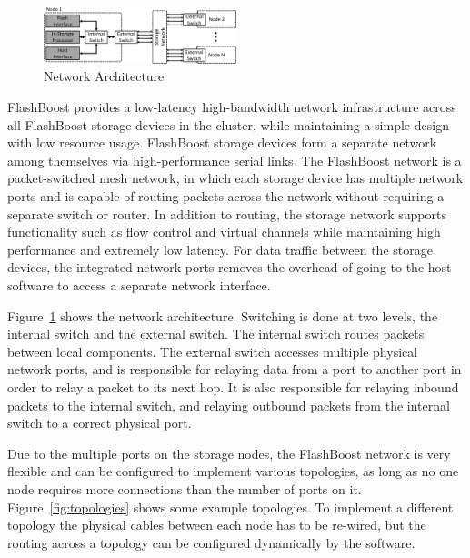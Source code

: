 \begin{figure}[t]
	\begin{center}
	\includegraphics[width=0.5\textwidth]{figures/network-architecture-crop.pdf}
	\caption{Network Architecture}
	\label{fig:networkinterface}
	\end{center}
\end{figure}


FlashBoost provides a low-latency high-bandwidth network infrastructure across
all FlashBoost storage devices in the cluster, while maintaining a simple design
with low resource usage. FlashBoost storage devices form a separate network
among themselves via high-performance serial links.  The FlashBoost network is a
packet-switched mesh network, in which each storage device has multiple network
ports and is capable of routing packets across the network without requiring a
separate switch or router.  In addition to routing, the storage network supports functionality such as
flow control and virtual channels while maintaining high performance and
extremely low latency.  For data traffic between the storage devices, the
integrated network ports removes the overhead of going to the host software to
access a separate network interface.

Figure~\ref{fig:networkinterface} shows the network architecture. Switching is
done at two levels, the internal switch and the external switch.  The internal
switch routes packets between local components.  The external switch accesses
multiple physical network ports, and is responsible for relaying data from a
port to another port in order to relay a packet to its next hop. It is also
responsible for relaying inbound packets to the internal
switch, and relaying outbound packets from the internal switch to a correct
physical port. 

Due to the multiple ports on the storage nodes, the FlashBoost network is very
flexible and can be configured to implement various topologies, as long as no
one node requires more connections than the number of ports on it.
Figure~\ref{fig:topologies} shows some example topologies. To implement a
different topology the physical cables between each node has to be re-wired, but
the routing across a topology can be configured dynamically by the software.

